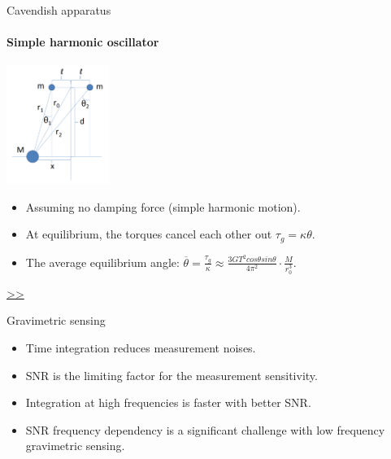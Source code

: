 \documentclass{beamer}
\begin{document}
\begin{frame}{Cavendish apparatus}
	\framesubtitle{Simple harmonic oscillator}
	\begin{center}		
		\includegraphics[width=0.25\textwidth,keepaspectratio]{Cavendish apparatus.PNG}
    \end{center}
	\begin{itemize}
		\item Assuming no damping force (simple harmonic motion).
		\item At equilibrium, the torques cancel each other out $\tau_g =  \kappa\theta$.
		\item The average equilibrium angle: $\overline{\theta} = \frac{\tau_g}{\kappa} \approx \frac{3GT^2cos\theta sin\theta}{4\pi^2 } \cdot \frac{M}{r_0^3}$.
		
	\end{itemize}
	\hyperlink{frame:Gravimetric sensing}{>>} 

\end{frame}
\begin{frame}{\hypertarget{frame:Gravimetric sensing}{Gravimetric sensing}}
	
	\begin{itemize}
		\item Time integration reduces measurement noises. 
		\item SNR is the limiting factor for the measurement sensitivity.		
		\pause
		\item Integration at high frequencies is faster with better SNR.
		\item SNR frequency dependency is a significant challenge with low frequency gravimetric sensing.

	\end{itemize}
\end{frame}
\end{document}
